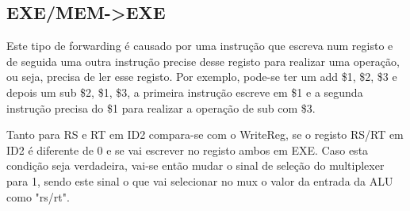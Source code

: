 \documentclass[pdftex,12pt,a4paper]{report}
\begin{document}
\subsection{EXE/MEM->EXE}

\begin{table}[!htb]
\centering
\label{my-label}
\end{table}

\begin{table}[!htb]
\centering
\label{for_ex_mem_exe}
\end{table}

Este tipo de forwarding é causado por uma instrução que escreva num registo e de seguida uma outra instrução precise desse registo para realizar uma operação, ou seja, precisa de ler esse registo. Por exemplo, pode-se ter um add \$1, \$2, \$3 e depois um sub \$2, \$1, \$3, a primeira instrução escreve em \$1 e a segunda instrução precisa do \$1  para realizar a operação de sub com \$3.
\linebreak

Tanto para RS e RT em ID2 compara-se com o WriteReg, se o registo RS/RT em ID2 é diferente de 0 e se vai escrever no registo ambos em EXE. 
Caso esta condição seja verdadeira, vai-se então mudar o sinal de seleção do multiplexer para 1, sendo este sinal o que vai selecionar no mux o valor da entrada da ALU como "rs/rt".
\end{document}
